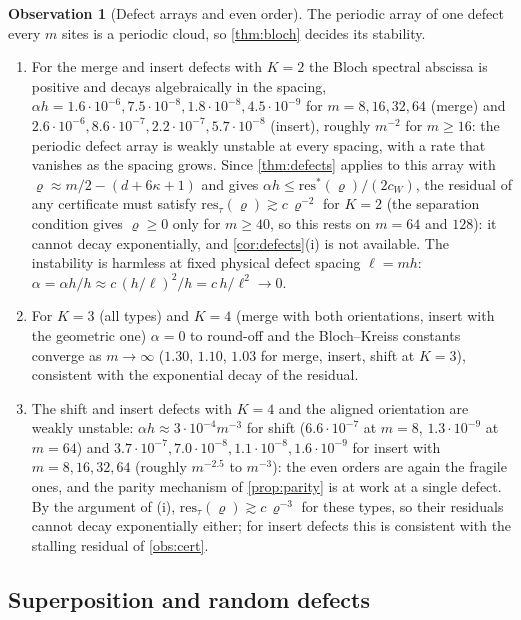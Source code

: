 \documentclass[11pt,a4paper]{article}
\theoremstyle{plain}
\theoremstyle{definition}
\newtheorem{observation}[theorem]{Observation}
\theoremstyle{remark}
\numberwithin{equation}{section}
\newcommand{\res}{\mathrm{res}}
\begin{document}
\begin{observation}[Defect arrays and even order]\label{obs:defectbloch}
The periodic array of one defect every $m$ sites is a periodic cloud, so \cref{thm:bloch} decides its stability.
\begin{enumerate}[label=(\roman*)]
\item For the merge and insert defects with $K=2$ the Bloch spectral abscissa is positive and decays algebraically in the spacing, $\alpha h=1.6\cdot10^{-6},7.5\cdot10^{-8},1.8\cdot10^{-8},4.5\cdot10^{-9}$ for $m=8,16,32,64$ (merge) and $2.6\cdot10^{-6},8.6\cdot10^{-7},2.2\cdot10^{-7},5.7\cdot10^{-8}$ (insert), roughly $m^{-2}$ for $m\ge16$: the periodic defect array is weakly unstable at every spacing, with a rate that vanishes as the spacing grows. Since \cref{thm:defects} applies to this array with $\varrho\approx m/2-(d+6\kappa+1)$ and gives $\alpha h\le\res^*(\varrho)/(2c_W)$, the residual of any certificate must satisfy $\res_\tau(\varrho)\gtrsim c\,\varrho^{-2}$ for $K=2$ (the separation condition gives $\varrho\ge0$ only for $m\ge40$, so this rests on $m=64$ and $128$): it cannot decay exponentially, and \cref{cor:defects}(i) is not available. The instability is harmless at fixed physical defect spacing $\ell=mh$: $\alpha=\alpha h/h\approx c\,(h/\ell)^{2}/h=c\,h/\ell^2\to0$.
\item For $K=3$ (all types) and $K=4$ (merge with both orientations, insert with the geometric one) $\alpha=0$ to round-off and the Bloch--Kreiss constants converge as $m\to\infty$ ($1.30$, $1.10$, $1.03$ for merge, insert, shift at $K=3$), consistent with the exponential decay of the residual.
\item The shift and insert defects with $K=4$ and the aligned orientation are weakly unstable: $\alpha h\approx 3\cdot10^{-4}m^{-3}$ for shift ($6.6\cdot10^{-7}$ at $m=8$, $1.3\cdot10^{-9}$ at $m=64$) and $3.7\cdot10^{-7},7.0\cdot10^{-8},1.1\cdot10^{-8},1.6\cdot10^{-9}$ for insert with $m=8,16,32,64$ (roughly $m^{-2.5}$ to $m^{-3}$): the even orders are again the fragile ones, and the parity mechanism of \cref{prop:parity} is at work at a single defect. By the argument of (i), $\res_\tau(\varrho)\gtrsim c\,\varrho^{-3}$ for these types, so their residuals cannot decay exponentially either; for insert defects this is consistent with the stalling residual of \cref{obs:cert}.
\end{enumerate}
\end{observation}

\subsection{Superposition and random defects}
\end{document}

